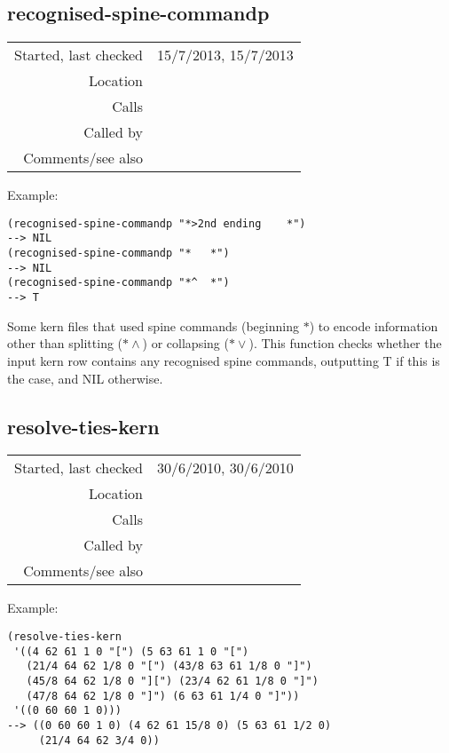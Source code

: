 \subsection*{recognised-spine-commandp}\label{fun:recognised-spine-commandp}

\vspace{0.3cm}
\begin{tabular}{r|p{8cm}}
Started, last checked & 15/7/2013, 15/7/2013 \\
Location & \nameref{sec:kern} \\
Calls & \\
Called by & \nameref{fun:kern-rows2col} \\
Comments/see also &
\end{tabular}

\vspace{0.5cm}
\noindent Example:
\begin{verbatim}
(recognised-spine-commandp "*>2nd ending	*")
--> NIL
(recognised-spine-commandp "*	*")
--> NIL
(recognised-spine-commandp "*^	*")
--> T
\end{verbatim}

\noindent Some kern files that used spine commands
(beginning $\ast$) to encode information other than
splitting ($\ast\wedge$) or collapsing ($\ast\vee$).
This function checks whether the input kern row
contains any recognised spine commands, outputting T
if this is the case, and NIL otherwise.


\subsection*{resolve-ties-kern}\label{fun:resolve-ties-kern}

\vspace{0.3cm}
\begin{tabular}{r|p{8cm}}
Started, last checked & 30/6/2010, 30/6/2010 \\
Location & \nameref{sec:kern} \\
Calls & \nameref{fun:index-of-backward-tie} \\
Called by & \nameref{fun:kern-file2dataset} \\
Comments/see also & \nameref{fun:resolve-ties}
\end{tabular}

\vspace{0.5cm}
\noindent Example:
\begin{verbatim}
(resolve-ties-kern
 '((4 62 61 1 0 "[") (5 63 61 1 0 "[")
   (21/4 64 62 1/8 0 "[") (43/8 63 61 1/8 0 "]")
   (45/8 64 62 1/8 0 "][") (23/4 62 61 1/8 0 "]")
   (47/8 64 62 1/8 0 "]") (6 63 61 1/4 0 "]"))
 '((0 60 60 1 0)))
--> ((0 60 60 1 0) (4 62 61 15/8 0) (5 63 61 1/2 0)
     (21/4 64 62 3/4 0))
\end{verbatim}

